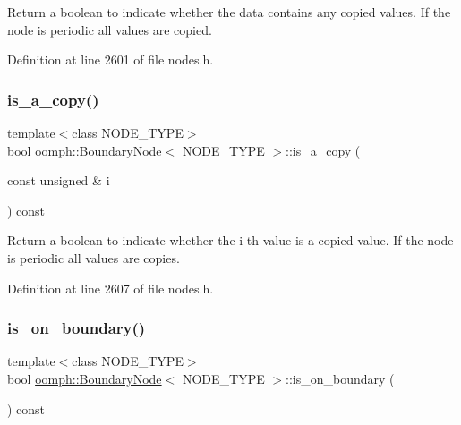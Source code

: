 Return a boolean to indicate whether the data contains any copied values. If the node is periodic all values are copied. 



Definition at line 2601 of file nodes.\+h.

\mbox{\label{classoomph_1_1BoundaryNode_a787efb1b118065987222b4c40c15570d}} 
\subsubsection{\texorpdfstring{is\+\_\+a\+\_\+copy()}{is\_a\_copy()}\hspace{0.1cm}{\footnotesize\ttfamily [2/2]}}
{\footnotesize\ttfamily template$<$class N\+O\+D\+E\+\_\+\+T\+Y\+PE$>$ \\
bool \hyperlink{classoomph_1_1BoundaryNode}{oomph\+::\+Boundary\+Node}$<$ N\+O\+D\+E\+\_\+\+T\+Y\+PE $>$\+::is\+\_\+a\+\_\+copy (\begin{DoxyParamCaption}\item[{const unsigned \&}]{i }\end{DoxyParamCaption}) const\hspace{0.3cm}{\ttfamily [inline]}}



Return a boolean to indicate whether the i-\/th value is a copied value. If the node is periodic all values are copies. 



Definition at line 2607 of file nodes.\+h.

\mbox{\label{classoomph_1_1BoundaryNode_a70e488e087d1da3ec13c4412935e5644}} 
\subsubsection{\texorpdfstring{is\+\_\+on\+\_\+boundary()}{is\_on\_boundary()}\hspace{0.1cm}{\footnotesize\ttfamily [1/2]}}
{\footnotesize\ttfamily template$<$class N\+O\+D\+E\+\_\+\+T\+Y\+PE$>$ \\
bool \hyperlink{classoomph_1_1BoundaryNode}{oomph\+::\+Boundary\+Node}$<$ N\+O\+D\+E\+\_\+\+T\+Y\+PE $>$\+::is\+\_\+on\+\_\+boundary (\begin{DoxyParamCaption}{ }\end{DoxyParamCaption}) const\hspace{0.3cm}{\ttfamily [inline]}}




